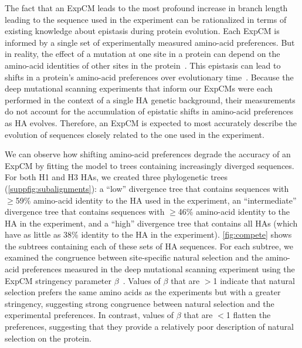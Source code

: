 \documentclass[11pt]{article}
\begin{document}
The fact that an ExpCM leads to the most profound increase in branch length leading to the sequence used in the experiment can be rationalized in terms of existing knowledge about epistasis during protein evolution.
Each ExpCM is informed by a single set of experimentally measured amino-acid preferences.
But in reality, the effect of a mutation at one site in a protein can depend on the amino-acid identities of other sites in the protein~\citep{ortlund2007crystal, gong2013stability, harms2014historical, tufts2014epistasis, starr2018pervasive}. 
This epistasis can lead to shifts in a protein's amino-acid preferences over evolutionary time~\citep{pollock2012amino, doud2015site, shah2015contingency, bazykin2015changing, haddox2018mapping}.
Because the deep mutational scanning experiments that inform our ExpCMs were each performed in the context of a single HA genetic background, their measurements do not account for the accumulation of epistatic shifts in amino-acid preferences as HA evolves. 
Therefore, an ExpCM is expected to most accurately describe the evolution of sequences closely related to the one used in the experiment.
 
We can observe how shifting amino-acid preferences degrade the accuracy of an ExpCM by fitting the model to trees containing increasingly diverged sequences.
For both H1 and H3 HAs, we created three phylogenetic trees (\ref{suppfig:subalignments}): a ``low'' divergence tree that contains sequences with $\ge$59\% amino-acid identity to the HA used in the experiment, an ``intermediate'' divergence tree that contains sequences with $\ge$46\% amino-acid identity to the HA in the experiment, and a ``high'' divergence tree that contains all HAs (which have as little as 38\% identity to the HA in the experiment).
\ref{fig:compete} shows the subtrees containing each of these sets of HA sequences.
For each subtree, we examined the congruence between site-specific natural selection and the amino-acid preferences measured in the deep mutational scanning experiment using the ExpCM stringency parameter $\beta$~\citep{bloom2014informed,hilton2017phydms}. 
Values of $\beta$ that are $>$1 indicate that natural selection prefers the same amino acids as the experiments but with a greater stringency, suggesting strong congruence between natural selection and the experimental preferences. 
In contrast, values of $\beta$ that are $<$1 flatten the preferences, suggesting that they provide a relatively poor description of natural selection on the protein.
\end{document}
